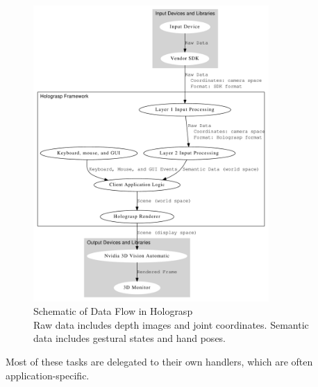 \documentclass[pageno]{jpaper}
\begin{document}
\begin{figure}[h]
\centering
\includegraphics[width=0.8\textwidth]{figures/software_architecture.pdf}
\caption{Schematic of Data Flow in Holograsp\\
Raw data includes depth images and joint coordinates. Semantic data includes
gestural states and hand poses.}
\label{fig:architecture}
\end{figure}

Most of these tasks are delegated to their own handlers, which are often application-specific.
\end{document}
